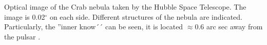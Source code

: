 \label{fig:knot}
Optical image of the Crab nebula taken by the Hubble Space Telescope. The image is 0.02$^\circ$ on each side. Different structures of the nebula are indicated. Particularly, the ''inner know´´ can be seen, it is located $\approx 0.6$ arc sec away from the pulsar \cite{rudy2015}.